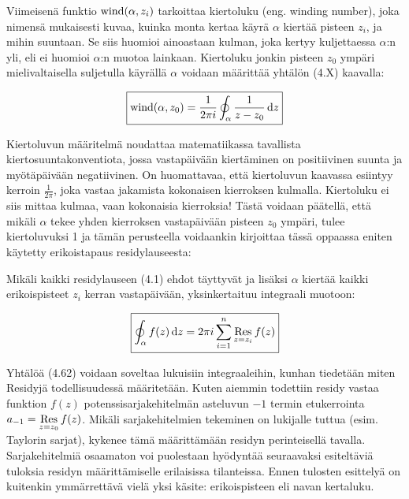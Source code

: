 \documentclass[../integrointiopas.tex]{subfiles}
\begin{document}
	Viimeisenä funktio $\mathrm{wind}(\alpha, z_i)$ tarkoittaa kiertoluku (eng. winding number), joka nimensä mukaisesti kuvaa, kuinka monta kertaa käyrä $\alpha$ kiertää pisteen $z_i$, ja mihin suuntaan. Se siis huomioi ainoastaan kulman, joka kertyy kuljettaessa $\alpha$:n yli, eli ei huomioi $\alpha$:n muotoa lainkaan. Kiertoluku jonkin pisteen $z_0$ ympäri mielivaltaisella suljetulla käyrällä $\alpha$ voidaan määrittää yhtälön (4.X) kaavalla:
	
	\begin{equation}
		\boxed{\wind(\alpha, z_0) = \frac{1}{2\pi i}\oint_{\alpha}\frac{1}{z - z_0}\odif{z}}
	\end{equation}

	Kiertoluvun määritelmä noudattaa matematiikassa tavallista kiertosuuntakonventiota, jossa vastapäivään kiertäminen on positiivinen suunta ja myötäpäivään negatiivinen. On huomattavaa, että kiertoluvun kaavassa esiintyy kerroin $\frac{1}{2\pi}$, joka vastaa jakamista kokonaisen kierroksen kulmalla. Kiertoluku ei siis mittaa kulmaa, vaan kokonaisia kierroksia! Tästä voidaan päätellä, että mikäli $\alpha$ tekee yhden kierroksen vastapäivään pisteen $z_0$ ympäri, tulee kiertoluvuksi 1 ja tämän perusteella voidaankin kirjoittaa tässä oppaassa eniten käytetty erikoistapaus residylauseesta:
	
	\begin{corollary}
		Mikäli kaikki residylauseen (4.1) ehdot täyttyvät ja lisäksi $\alpha$ kiertää kaikki erikoispisteet $z_i$ kerran vastapäivään, yksinkertaituu integraali muotoon:
		
		\begin{equation}
			\boxed{\oint_{\alpha}f(z)\odif{z} = 2\pi i\sum_{i = 1}^{n}\res{z = z_i}f(z)}
		\end{equation}
	\end{corollary}

	Yhtälöä (4.62) voidaan soveltaa lukuisiin integraaleihin, kunhan tiedetään miten Residyjä todellisuudessä määritetään. Kuten aiemmin todettiin residy vastaa funktion $f(z)$ potenssisarjakehitelmän asteluvun $-1$ termin etukerrointa $a_{-1} = \underset{z = z_0}{\mathrm{Res}}\,f(z)$. Mikäli sarjakehitelmien tekeminen on lukijalle tuttua (esim. Taylorin sarjat), kykenee tämä määrittämään residyn perinteisellä tavalla. Sarjakehitelmiä osaamaton voi puolestaan hyödyntää seuraavaksi esiteltäviä tuloksia residyn määrittämiselle erilaisissa tilanteissa. Ennen tulosten esittelyä on kuitenkin ymmärrettävä vielä yksi käsite: erikoispisteen eli navan kertaluku.
	
\end{document}
